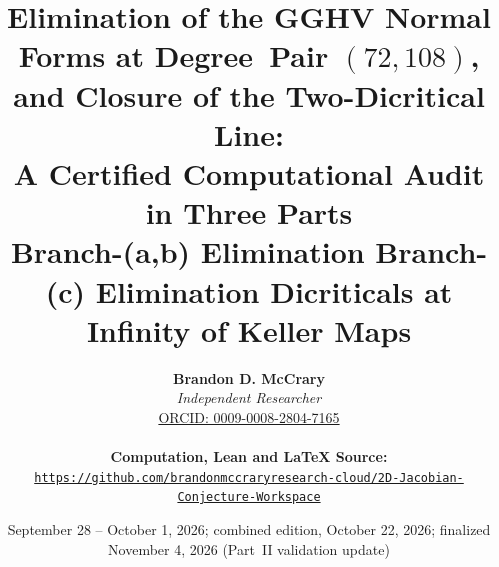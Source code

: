 \documentclass[a4paper,11pt]{article}
\theoremstyle{plain}
\theoremstyle{definition}
\theoremstyle{remark}
\begin{document}
\title{\textbf{\Large Elimination of the GGHV Normal Forms at Degree~Pair $(72,108)$, and Closure of the Two-Dicritical Line:}\\[0.6em]
\large A Certified Computational Audit in Three Parts\\[0.4em]
\normalsize Branch-(a,b) Elimination \textperiodcentered{} Branch-(c) Elimination \textperiodcentered{} Dicriticals at Infinity of Keller Maps}
\author{\textbf{Brandon D. McCrary}\\[0.25em]
\textit{Independent Researcher}\\[0.25em]
\href{https://orcid.org/0009-0008-2804-7165}{ORCID: 0009-0008-2804-7165}\\[0.6em]
{\small \parbox{0.92\textwidth}{\centering \textbf{Computation, Lean and LaTeX Source:}\\
{\color{neonmagenta}\hypersetup{urlcolor=neonmagenta}\href{https://github.com/brandonmccraryresearch-cloud/2D-Jacobian-Conjecture-Workspace}{\nolinkurl{https://github.com/brandonmccraryresearch-cloud/2D-Jacobian-Conjecture-Workspace}}}}}}
\date{September 28 -- October 1, 2026; combined edition, October 22, 2026; finalized November 4, 2026 (Part~II validation update)}
\maketitle
\end{document}

